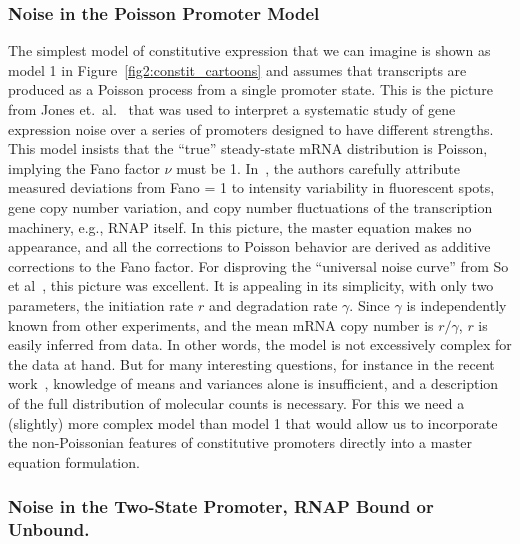 \subsubsection{Noise in the Poisson Promoter Model}

The simplest model of constitutive expression that we can imagine is shown as
model 1 in Figure~\ref{fig2:constit_cartoons} and assumes that transcripts are
produced as a Poisson process from a single promoter state. This is the picture
from Jones et.\ al.~\cite{Jones2014} that was used to interpret a systematic
study of gene expression noise over a series of promoters designed to have
different strengths. This model insists that the ``true'' steady-state mRNA
distribution is Poisson, implying the Fano factor $\nu$ must be 1.
In~\cite{Jones2014}, the authors carefully attribute measured deviations from
Fano = 1 to intensity variability in fluorescent spots, gene copy number
variation, and copy number fluctuations of the transcription machinery, e.g.,
RNAP itself. In this picture, the master equation makes no appearance, and all
the corrections to Poisson behavior are derived as additive corrections to the
Fano factor. For disproving the ``universal noise curve'' from So et
al~\cite{So2011}, this picture was excellent. It is appealing in its simplicity,
with only two parameters, the initiation rate $r$ and degradation rate $\gamma$.
Since $\gamma$ is independently known from other experiments, and the mean mRNA
copy number is $r/\gamma$, $r$ is easily inferred from data. In other words, the
model is not excessively complex for the data at hand. But for many interesting
questions, for instance in the recent work~\cite{Razo-Mejia2020}, knowledge of
means and variances alone is insufficient, and a description of the full
distribution of molecular counts is necessary. For this we need a (slightly)
more complex model than model 1 that would allow us to incorporate the
non-Poissonian features of constitutive promoters directly into a master
equation formulation.

\subsubsection{Noise in the Two-State Promoter, RNAP Bound or Unbound.}

